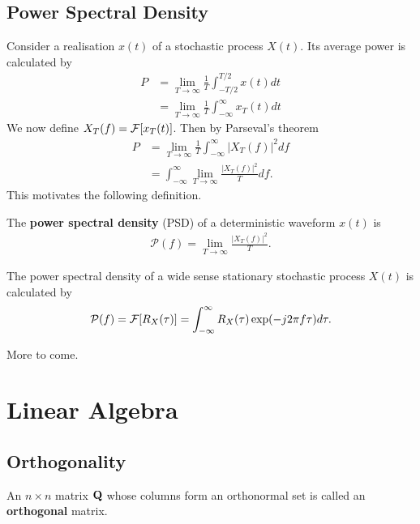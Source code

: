 \documentclass{memoir}
\begin{document}
\subsection{Power Spectral Density}
Consider a realisation $x(t)$ of a stochastic process $X(t)$. Its average power is calculated by
\begin{align*}
    P &= \lim_{T \to \infty} \frac{1}{T} \int_{-T/2}^{T/2} x(t) dt \\
    &= \lim_{T \to \infty} \frac{1}{T} \int_{-\infty}^{\infty} x_T(t) dt
\end{align*}
We now define $X_T(f) = \mathcal{F}[x_T(t)]$. Then by Parseval's theorem
\begin{align*}
    P &= \lim_{T \to \infty} \frac{1}{T} \int_{-\infty}^{\infty} |X_T(f)|^2 df \\
    &= \int_{-\infty}^{\infty} \lim_{T \to \infty} \frac{|X_T(f)|^2}{T} df.
\end{align*}
This motivates the following definition.
\begin{definition}
    The \textbf{power spectral density} (PSD) of a deterministic waveform $x(t)$ is
    \begin{align*}
        \mathcal{P}(f) = \lim_{T \to \infty} \frac{|X_T(f)|^2}{T}.
    \end{align*}
\end{definition}

\begin{theorem}
    The power spectral density of a wide sense stationary stochastic process $X(t)$ is calculated by
    \begin{align*}
        \mathcal{P}(f) = \mathcal{F}[R_X(\tau)] = \int_{-\infty}^{\infty} R_X(\tau) \exp(-j2\pi f \tau) d \tau.
    \end{align*}
\end{theorem}

More to come.

\section{Linear Algebra}
\subsection{Orthogonality}
\begin{definition}
    An $n \times n$ matrix $\boldsymbol{\mathbf{Q}}$ whose columns form an orthonormal set is called an \textbf{orthogonal} matrix.
\end{definition}
\end{document}
